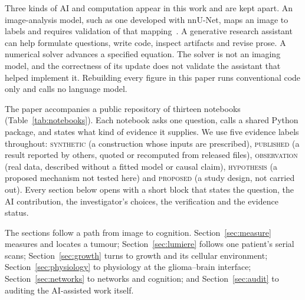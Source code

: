 \documentclass[11pt,a4paper]{article}
\newcommand{\evidence}[1]{\textsc{#1}}
\begin{document}
Three kinds of AI and computation appear in this work and are kept apart. An
image-analysis model, such as one developed with nnU-Net, maps an image to
labels and requires validation of that mapping~\cite{isensee2021}. A generative
research assistant can help formulate questions, write code, inspect artifacts
and revise prose. A numerical solver advances a specified equation. The solver
is not an imaging model, and the correctness of its update does not validate
the assistant that helped implement it. Rebuilding every figure in this paper
runs conventional code only and calls no language model.

The paper accompanies a public repository of thirteen notebooks
(Table~\ref{tab:notebooks}). Each notebook asks one question, calls a shared
Python package, and states what kind of evidence it supplies. We use five
evidence labels throughout:
\evidence{synthetic} (a construction whose inputs are prescribed),
\evidence{published} (a result reported by others, quoted or recomputed from
released files), \evidence{observation} (real data, described without a
fitted model or causal claim), \evidence{hypothesis} (a proposed mechanism not
tested here) and \evidence{proposed} (a study design, not carried out). Every
section below opens with a short block that states the question, the AI
contribution, the investigator's choices, the verification and the evidence
status.

The sections follow a path from image to cognition. Section~\ref{sec:measure}
measures and locates a tumour; Section~\ref{sec:lumiere} follows one patient's
serial scans; Section~\ref{sec:growth} turns to growth and its cellular
environment; Section~\ref{sec:physiology} to physiology at the glioma--brain
interface; Section~\ref{sec:networks} to networks and cognition; and
Section~\ref{sec:audit} to auditing the AI-assisted work itself.
\end{document}
